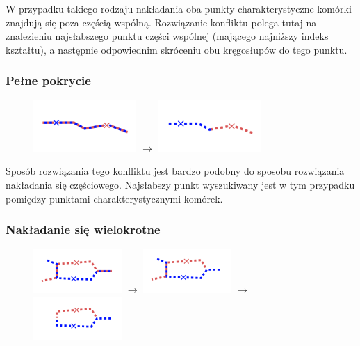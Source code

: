 \documentclass[declaration,shortabstract,mgr]{iithesis}
\begin{document}
W przypadku takiego rodzaju nakładania oba punkty charakterystyczne komórki znajdują się poza częścią wspólną.
Rozwiązanie konfliktu polega tutaj na znalezieniu najsłabszego punktu części wspólnej (mającego najniższy indeks kształtu), a następnie odpowiednim skróceniu obu kręgosłupów do tego punktu.

\subsubsection{Pełne pokrycie}

\begin{figure}[H]
  \centering
  \includegraphics[valign=m,width=0.35\textwidth]{images/overlap-f.png}
  $\rightarrow$
  \includegraphics[valign=m,width=0.35\textwidth]{images/overlap-f-solved.png}
\end{figure}

Sposób rozwiązania tego konfliktu jest bardzo podobny do sposobu rozwiązania nakładania się częściowego. Najsłabszy punkt wyszukiwany jest w tym przypadku pomiędzy punktami charakterystycznymi komórek.


\subsubsection{Nakładanie się wielokrotne}

\begin{figure}[H]
  \centering
  \includegraphics[valign=m,width=0.3\textwidth]{images/overlap-m.png}
  $\rightarrow$
  \includegraphics[valign=m,width=0.3\textwidth]{images/overlap-m-solved1.png}
  $\rightarrow$
  \includegraphics[valign=m,width=0.3\textwidth]{images/overlap-m-solved2.png}
\end{figure}
\end{document}
